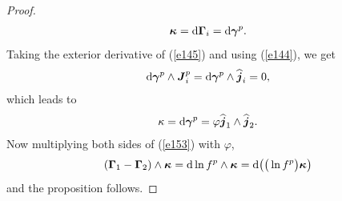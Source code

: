 \documentclass[pdftex]{sigma}
\numberwithin{equation}{section}
\begin{document}
\begin{proof}
\begin{gather*}
\boldsymbol{\kappa }={\rm d}\boldsymbol{\Gamma }_{i}={\rm d}\boldsymbol{\gamma }^{p}.
\end{gather*}
Taking the exterior derivative of (\ref{e145}) and using (\ref{e144}), we get
\begin{gather*}
{\rm d}\boldsymbol{\gamma }^{p}\wedge \boldsymbol{J}_{i}^{p}={\rm d}\boldsymbol{\gamma }^{p}\wedge \widehat{\boldsymbol{j}}_{i}=0,
\end{gather*}
which leads to
\begin{gather}
\kappa ={\rm d}\boldsymbol{\gamma }^{p}=\varphi \widehat{\boldsymbol{j}}_{1}\wedge \widehat{\boldsymbol{j}}_{2}. \label{e156}
\end{gather}
Now multiplying both sides of (\ref{e153}) with $\varphi $,
\begin{gather*}
( \boldsymbol{\Gamma }_{1}-\boldsymbol{\Gamma }_{2}) \wedge \boldsymbol{\kappa }={\rm d}\ln f^{p}\wedge \boldsymbol{\kappa }={\rm d}\big( \big( \ln f^{p}\big) \boldsymbol{\kappa }\big)
\end{gather*}
and the proposition follows.
\end{proof}
\end{document}
